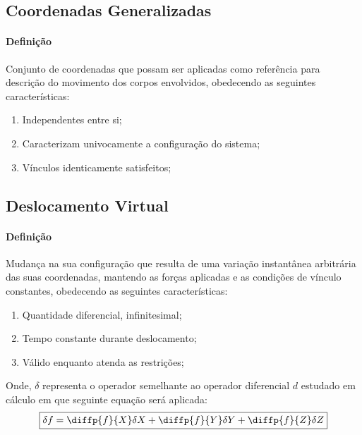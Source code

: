 \documentclass{article}
\begin{document}
        \subsection{Coordenadas Generalizadas}
            \paragraph{Definição}Conjunto de coordenadas que possam ser aplicadas como referência para descrição do movimento dos corpos envolvidos, obedecendo as seguintes características:
                \begin{enumerate}[noitemsep]
                    \item Independentes entre si;
                    \item Caracterizam univocamente a configuração do sistema;
                    \item Vínculos identicamente satisfeitos;
                \end{enumerate}

        \subsection{Deslocamento Virtual}
            \paragraph{Definição}Mudança na sua configuração que resulta de uma variação instantânea arbitrária das suas coordenadas, mantendo as forças aplicadas e as condições de vínculo constantes, obedecendo as seguintes características:
                \begin{enumerate}[rightmargin = \leftmargin, noitemsep]
                    \item Quantidade diferencial, infinitesimal;
                    \item Tempo constante durante deslocamento;
                    \item Válido enquanto atenda as restrições;
                \end{enumerate}
            Onde, $\delta$ representa o operador semelhante ao operador diferencial $d$ estudado em cálculo em que seguinte equação será aplicada:
                \begin{equation}
                    \boxed{
                        \delta f = 
                        \diffp{f}{X}\delta X + 
                        \diffp{f}{Y}\delta Y + 
                        \diffp{f}{Z}\delta Z
                    }
                \end{equation}
\end{document}
